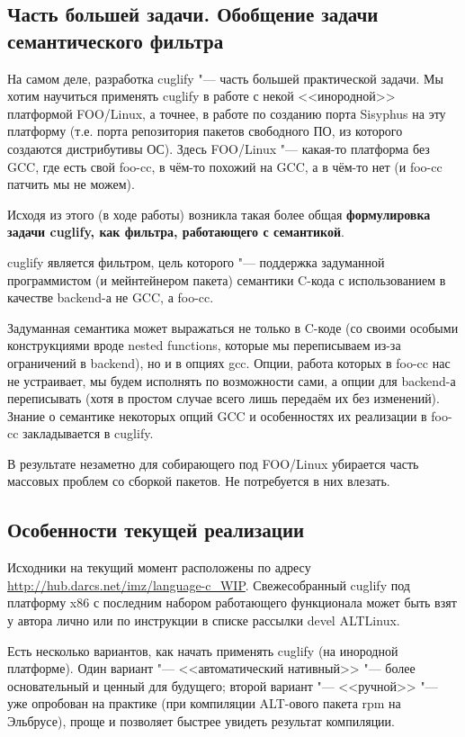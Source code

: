 \documentclass[10pt, a5paper]{article}
\begin{document}
\subsection*{Часть большей задачи. Обобщение задачи семантического фильтра}

На самом деле, разработка cuglify "--- часть большей практической задачи. Мы хотим научиться применять cuglify в работе с некой <<инородной>> платформой FOO/Linux, а точнее, в работе по созданию порта Sisyphus на эту платформу (т.е. порта репозитория пакетов свободного ПО, из которого создаются дистрибутивы ОС). Здесь FOO/Linux "--- какая-то платформа без GCC, где есть свой foo-cc, в чём-то похожий на GCC, а в чём-то нет (и foo-cc патчить мы не можем).

Исходя из этого (в ходе работы) возникла такая более общая \textbf{формулировка задачи cuglify, как фильтра, работающего с семантикой}.

cuglify является фильтром, цель которого "--- поддержка задуманной программистом (и мейнтейнером пакета) семантики C-кода с использованием в качестве backend-а не GCC, а foo-cc.

Задуманная семантика может выражаться не только в C-коде (со своими особыми конструкциями вроде nested functions, которые мы переписываем из-за ограничений в backend), но и в опциях gcc. Опции, работа которых в foo-cc нас не устраивает, мы будем исполнять по возможности сами, а опции для backend-а переписывать (хотя в простом случае всего лишь передаём их без изменений). Знание о семантике некоторых опций GCC и особенностях их реализации в foo-cc закладывается в cuglify.

В результате незаметно для собирающего под FOO/Linux убирается часть массовых проблем со сборкой пакетов. Не потребуется в них влезать.

\subsection*{Особенности текущей реализации}

Исходники на текущий момент расположены по адресу \linebreak \url{http://hub.darcs.net/imz/language-c_WIP}. Свежесобранный \linebreak cuglify под платформу x86 с последним набором работающего функционала может быть взят у автора лично или по инструкции в списке рассылки devel ALTLinux\footnotemark[5].

Есть несколько вариантов, как начать применять cuglify (на инородной платформе). Один вариант "--- <<автоматический нативный>> "--- более основательный и ценный для будущего; второй вариант "--- <<ручной>> "--- уже опробован на практике (при компиляции ALT-ового пакета rpm на Эльбрусе), проще и позволяет быстрее увидеть результат компиляции.
\end{document}
